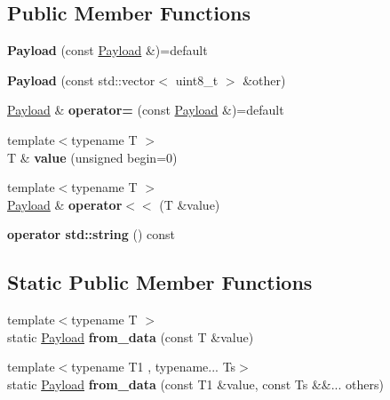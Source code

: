 \subsection*{Public Member Functions}
\begin{DoxyCompactItemize}
\item 
\mbox{\label{class_c_a_nopen_1_1_payload_a1177f8bbace9e9779c7549ae7ace1681}} 
{\bfseries Payload} (const \hyperlink{class_c_a_nopen_1_1_payload}{Payload} \&)=default
\item 
\mbox{\label{class_c_a_nopen_1_1_payload_ab0769e01554cc879840463e2a55eab0e}} 
{\bfseries Payload} (const std\+::vector$<$ uint8\+\_\+t $>$ \&other)
\item 
\mbox{\label{class_c_a_nopen_1_1_payload_a646541a9ec787a3fcdbbcba153e8553c}} 
\hyperlink{class_c_a_nopen_1_1_payload}{Payload} \& {\bfseries operator=} (const \hyperlink{class_c_a_nopen_1_1_payload}{Payload} \&)=default
\item 
\mbox{\label{class_c_a_nopen_1_1_payload_aef05ef8cfc8b9ba4170891f3168a726b}} 
{\footnotesize template$<$typename T $>$ }\\T \& {\bfseries value} (unsigned begin=0)
\item 
\mbox{\label{class_c_a_nopen_1_1_payload_a7386499320878a2ab437f419f9970d7c}} 
{\footnotesize template$<$typename T $>$ }\\\hyperlink{class_c_a_nopen_1_1_payload}{Payload} \& {\bfseries operator$<$$<$} (T \&value)
\item 
\mbox{\label{class_c_a_nopen_1_1_payload_a61e7092a555d000dfd59c6942823c9f1}} 
{\bfseries operator std\+::string} () const
\end{DoxyCompactItemize}
\subsection*{Static Public Member Functions}
\begin{DoxyCompactItemize}
\item 
\mbox{\label{class_c_a_nopen_1_1_payload_a1264ea3795f5d7e1a1a153121b15e25f}} 
{\footnotesize template$<$typename T $>$ }\\static \hyperlink{class_c_a_nopen_1_1_payload}{Payload} {\bfseries from\+\_\+data} (const T \&value)
\item 
\mbox{\label{class_c_a_nopen_1_1_payload_aeb95d2ae0204e12a46df4d7c97788739}} 
{\footnotesize template$<$typename T1 , typename... Ts$>$ }\\static \hyperlink{class_c_a_nopen_1_1_payload}{Payload} {\bfseries from\+\_\+data} (const T1 \&value, const Ts \&\&... others)
\end{DoxyCompactItemize}



